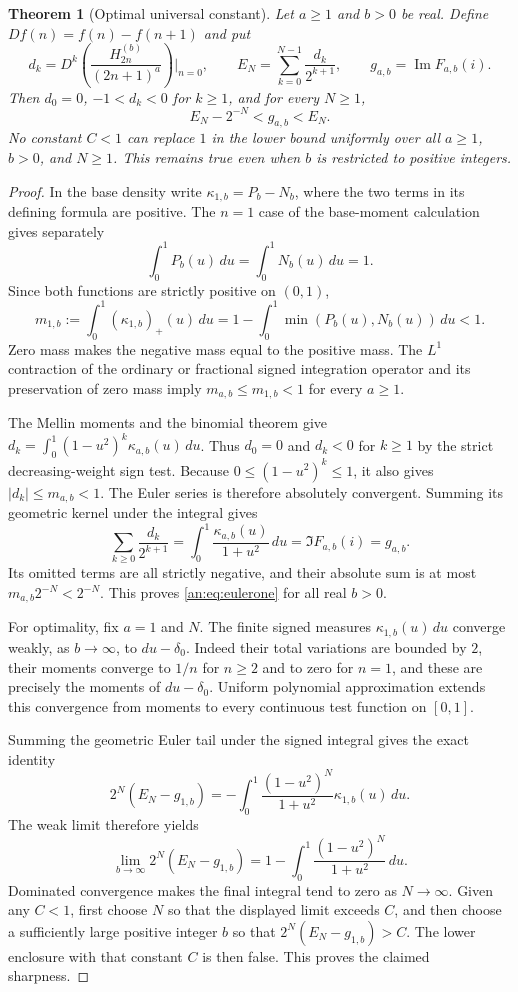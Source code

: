 \documentclass[11pt]{article}
\numberwithin{equation}{section}
\theoremstyle{plain}
\newtheorem{theorem}{Theorem}[section]
\theoremstyle{definition}
\theoremstyle{remark}
\begin{document}
\begin{theorem}[Optimal universal constant]
\label{an:thm:eulerconstant}
Let $a\ge1$ and $b>0$ be real. Define $Df(n)=f(n)-f(n+1)$ and put
\[
 d_k=D^k\left(\frac{H_{2n}^{(b)}}{(2n+1)^a}\right)\bigg|_{n=0},
 \qquad E_N=\sum_{k=0}^{N-1}\frac{d_k}{2^{k+1}},
 \qquad g_{a,b}=\operatorname{Im}F_{a,b}(i).
\]
Then $d_0=0$, $-1<d_k<0$ for $k\ge1$, and for every $N\ge1$,
\begin{equation}\label{an:eq:eulerone}
 E_N-2^{-N}<g_{a,b}<E_N.
\end{equation}
No constant $C<1$ can replace $1$ in the lower bound uniformly
over all $a\ge1$, $b>0$, and $N\ge1$. This remains true even when
$b$ is restricted to positive integers.
\end{theorem}
\begin{proof}
In the base density write $\kappa_{1,b}=P_b-N_b$, where the two
terms in its defining formula are positive. The $n=1$ case of the
base-moment calculation gives separately
\[
 \int_0^1P_b(u)\,du=\int_0^1N_b(u)\,du=1.
\]
Since both functions are strictly positive on $(0,1)$,
\[
 m_{1,b}:=\int_0^1(\kappa_{1,b})_+(u)\,du
 =1-\int_0^1\min(P_b(u),N_b(u))\,du<1.
\]
Zero mass makes the negative mass equal to the positive mass.
The $L^1$ contraction of the ordinary or fractional signed integration operator and its
preservation of zero mass imply $m_{a,b}\le m_{1,b}<1$ for every
$a\ge1$.

The Mellin moments and the binomial theorem give
$d_k=\int_0^1(1-u^2)^k\kappa_{a,b}(u)\,du$. Thus $d_0=0$ and
$d_k<0$ for $k\ge1$ by the strict decreasing-weight sign test.
Because $0\le(1-u^2)^k\le1$, it also gives
$|d_k|\le m_{a,b}<1$. The Euler series is therefore absolutely convergent. Summing its
geometric kernel under the integral gives
\[
 \sum_{k\ge0}\frac{d_k}{2^{k+1}}
 =\int_0^1\frac{\kappa_{a,b}(u)}{1+u^2}\,du
 =\Im F_{a,b}(i)=g_{a,b}.
\]
Its omitted terms are all strictly negative, and their absolute
sum is at most $m_{a,b}2^{-N}<2^{-N}$. This proves
\eqref{an:eq:eulerone} for all real $b>0$.

For optimality, fix $a=1$ and $N$. The finite signed measures
$\kappa_{1,b}(u)\,du$ converge weakly, as $b\to\infty$, to
$du-\delta_0$. Indeed their total variations are bounded by $2$,
their moments converge to $1/n$ for $n\ge2$ and to zero for
$n=1$, and these are precisely the moments of $du-\delta_0$.
Uniform polynomial approximation extends this convergence from
moments to every continuous test function on $[0,1]$.

Summing the geometric Euler tail under the signed integral gives
the exact identity
\[
 2^N(E_N-g_{1,b})
 =-\int_0^1\frac{(1-u^2)^N}{1+u^2}\kappa_{1,b}(u)\,du.
\]
The weak limit therefore yields
\[
 \lim_{b\to\infty}2^N(E_N-g_{1,b})
 =1-\int_0^1\frac{(1-u^2)^N}{1+u^2}\,du.
\]
Dominated convergence makes the final integral tend to zero as
$N\to\infty$. Given any $C<1$, first choose $N$ so that the
displayed limit exceeds $C$, and then choose a sufficiently large
positive integer $b$ so that $2^N(E_N-g_{1,b})>C$. The lower
enclosure with that constant $C$ is then false. This proves the
claimed sharpness.
\end{proof}
\end{document}
